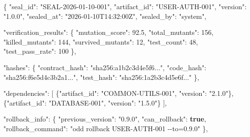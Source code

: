 \documentclass[
]{article}
\newenvironment{Shaded}{}{}
\newcommand{\DataTypeTok}[1]{\textcolor[rgb]{0.56,0.13,0.00}{#1}}
\newcommand{\DecValTok}[1]{\textcolor[rgb]{0.25,0.63,0.44}{#1}}
\newcommand{\FloatTok}[1]{\textcolor[rgb]{0.25,0.63,0.44}{#1}}
\newcommand{\FunctionTok}[1]{\textcolor[rgb]{0.02,0.16,0.49}{#1}}
\newcommand{\KeywordTok}[1]{\textcolor[rgb]{0.00,0.44,0.13}{\textbf{#1}}}
\newcommand{\OtherTok}[1]{\textcolor[rgb]{0.00,0.44,0.13}{#1}}
\newcommand{\StringTok}[1]{\textcolor[rgb]{0.25,0.44,0.63}{#1}}
\begin{document}
\begin{Shaded}
\begin{Highlighting}[]
\FunctionTok{\{}
  \DataTypeTok{"seal\_id"}\FunctionTok{:} \StringTok{"SEAL{-}2026{-}01{-}10{-}001"}\FunctionTok{,}
  \DataTypeTok{"artifact\_id"}\FunctionTok{:} \StringTok{"USER{-}AUTH{-}001"}\FunctionTok{,}
  \DataTypeTok{"version"}\FunctionTok{:} \StringTok{"1.0.0"}\FunctionTok{,}
  \DataTypeTok{"sealed\_at"}\FunctionTok{:} \StringTok{"2026{-}01{-}10T14:32:00Z"}\FunctionTok{,}
  \DataTypeTok{"sealed\_by"}\FunctionTok{:} \StringTok{"system"}\FunctionTok{,}
  
  \DataTypeTok{"verification\_results"}\FunctionTok{:} \FunctionTok{\{}
    \DataTypeTok{"mutation\_score"}\FunctionTok{:} \FloatTok{92.5}\FunctionTok{,}
    \DataTypeTok{"total\_mutants"}\FunctionTok{:} \DecValTok{156}\FunctionTok{,}
    \DataTypeTok{"killed\_mutants"}\FunctionTok{:} \DecValTok{144}\FunctionTok{,}
    \DataTypeTok{"survived\_mutants"}\FunctionTok{:} \DecValTok{12}\FunctionTok{,}
    \DataTypeTok{"test\_count"}\FunctionTok{:} \DecValTok{48}\FunctionTok{,}
    \DataTypeTok{"test\_pass\_rate"}\FunctionTok{:} \DecValTok{100}
  \FunctionTok{\},}
  
  \DataTypeTok{"hashes"}\FunctionTok{:} \FunctionTok{\{}
    \DataTypeTok{"contract\_hash"}\FunctionTok{:} \StringTok{"sha256:a1b2c3d4e5f6..."}\FunctionTok{,}
    \DataTypeTok{"code\_hash"}\FunctionTok{:} \StringTok{"sha256:f6e5d4c3b2a1..."}\FunctionTok{,}
    \DataTypeTok{"test\_hash"}\FunctionTok{:} \StringTok{"sha256:1a2b3c4d5e6f..."}
  \FunctionTok{\},}
  
  \DataTypeTok{"dependencies"}\FunctionTok{:} \OtherTok{[}
    \FunctionTok{\{}\DataTypeTok{"artifact\_id"}\FunctionTok{:} \StringTok{"COMMON{-}UTILS{-}001"}\FunctionTok{,} \DataTypeTok{"version"}\FunctionTok{:} \StringTok{"2.1.0"}\FunctionTok{\}}\OtherTok{,}
    \FunctionTok{\{}\DataTypeTok{"artifact\_id"}\FunctionTok{:} \StringTok{"DATABASE{-}001"}\FunctionTok{,} \DataTypeTok{"version"}\FunctionTok{:} \StringTok{"1.5.0"}\FunctionTok{\}}
  \OtherTok{]}\FunctionTok{,}
  
  \DataTypeTok{"rollback\_info"}\FunctionTok{:} \FunctionTok{\{}
    \DataTypeTok{"previous\_version"}\FunctionTok{:} \StringTok{"0.9.0"}\FunctionTok{,}
    \DataTypeTok{"can\_rollback"}\FunctionTok{:} \KeywordTok{true}\FunctionTok{,}
    \DataTypeTok{"rollback\_command"}\FunctionTok{:} \StringTok{"odd rollback USER{-}AUTH{-}001 {-}{-}to=0.9.0"}
  \FunctionTok{\},}
  

\end{Highlighting}
\end{Shaded}
\end{document}
